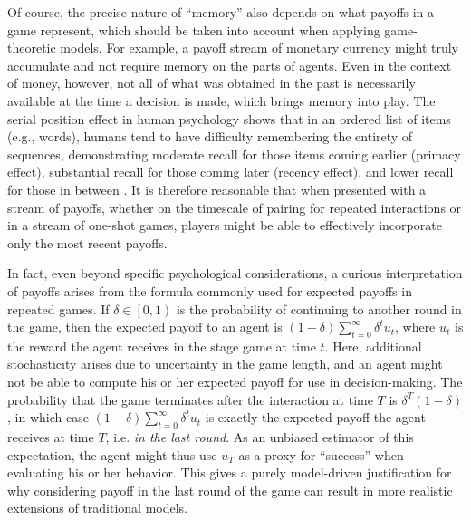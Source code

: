 \documentclass[11pt]{article}
\theoremstyle{plainCl1}
\theoremstyle{plainCl2}
\begin{document}
Of course, the precise nature of ``memory'' also depends on what payoffs in a game represent, which should be taken into account when applying game-theoretic models. For example, a payoff stream of monetary currency might truly accumulate and not require memory on the parts of agents. Even in the context of money, however, not all of what was obtained in the past is necessarily available at the time a decision is made, which brings memory into play. The serial position effect in human psychology shows that in an ordered list of items (e.g., words), humans tend to have difficulty remembering the entirety of sequences, demonstrating moderate recall for those items coming earlier (primacy effect), substantial recall for those coming later (recency effect), and lower recall for those in between \citep{murdock:JEP:1962}. It is therefore reasonable that when presented with a stream of payoffs, whether on the timescale of pairing for repeated interactions or in a stream of one-shot games, players might be able to effectively incorporate only the most recent payoffs.

In fact, even beyond specific psychological considerations, a curious interpretation of payoffs arises from the formula commonly used for expected payoffs in repeated games. If $\delta\in\left[0,1\right)$ is the probability of continuing to another round in the game, then the expected payoff to an agent is $\left(1-\delta\right)\sum_{t=0}^{\infty}\delta^{t}u_{t}$, where $u_{t}$ is the reward the agent receives in the stage game at time $t$. Here, additional stochasticity arises due to uncertainty in the game length, and an agent might not be able to compute his or her expected payoff for use in decision-making. The probability that the game terminates after the interaction at time $T$ is $\delta^{T}\left(1-\delta\right)$, in which case $\left(1-\delta\right)\sum_{t=0}^{\infty}\delta^{t}u_{t}$ is exactly the expected payoff the agent receives at time $T$, i.e. \emph{in the last round}. As an unbiased estimator of this expectation, the agent might thus use $u_{T}$ as a proxy for ``success'' when evaluating his or her behavior. This gives a purely model-driven justification for why considering payoff in the last round of the game can result in more realistic extensions of traditional models.
\end{document}
